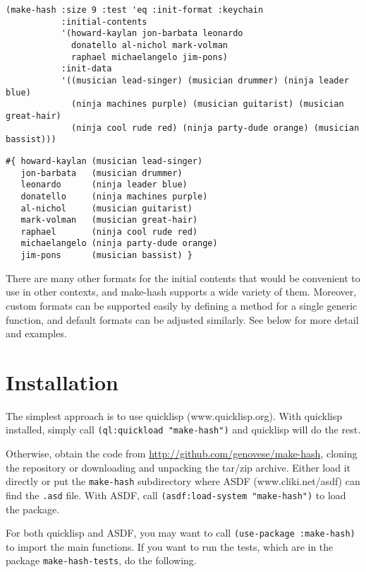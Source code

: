\documentclass[11pt]{article}
\begin{document}
\begin{verbatim}
(make-hash :size 9 :test 'eq :init-format :keychain
           :initial-contents
           '(howard-kaylan jon-barbata leonardo
             donatello al-nichol mark-volman
             raphael michaelangelo jim-pons)
           :init-data
           '((musician lead-singer) (musician drummer) (ninja leader blue)
             (ninja machines purple) (musician guitarist) (musician great-hair)
             (ninja cool rude red) (ninja party-dude orange) (musician bassist)))
\end{verbatim}





\begin{verbatim}
#{ howard-kaylan (musician lead-singer)
   jon-barbata   (musician drummer)
   leonardo      (ninja leader blue)
   donatello     (ninja machines purple)
   al-nichol     (musician guitarist)
   mark-volman   (musician great-hair)
   raphael       (ninja cool rude red)
   michaelangelo (ninja party-dude orange)
   jim-pons      (musician bassist) }
\end{verbatim}




  There are many other formats for the initial contents that would be
  convenient to use in other contexts, and make-hash supports a wide
  variety of them. Moreover, custom formats can be supported easily by
  defining a method for a single generic function, and default formats
  can be adjusted similarly. See below for more detail and examples.
\section{Installation}
\label{sec-2}


  The simplest approach is to use quicklisp (www.quicklisp.org).
  With quicklisp installed, simply call \texttt{(ql:quickload "make-hash")}
  and quicklisp will do the rest.
  
  Otherwise, obtain the code from \href{http://github.com/genovese/make-hash}{http://github.com/genovese/make-hash},
  cloning the repository or downloading and unpacking the tar/zip archive.
  Either load it directly or put the \texttt{make-hash} subdirectory
  where ASDF (www.cliki.net/asdf) can find the \texttt{.asd} file.
  With ASDF, call \texttt{(asdf:load-system "make-hash")} to load the
  package.

  For both quicklisp and ASDF, you may want to call
  \texttt{(use-package :make-hash)} to import the main functions. If you want to
  run the tests, which are in the package \texttt{make-hash-tests}, do the
  following.
\end{document}
